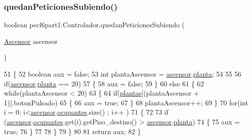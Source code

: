 \subsubsection{\texorpdfstring{quedan\+Peticiones\+Subiendo()}{quedanPeticionesSubiendo()}}
{\footnotesize\ttfamily boolean pecl6part1.\+Controlador.\+quedan\+Peticiones\+Subiendo (\begin{DoxyParamCaption}\item[{\mbox{\hyperlink{classpecl6part1_1_1_ascensor}{Ascensor}}}]{ascensor }\end{DoxyParamCaption})\hspace{0.3cm}{\ttfamily [inline]}}


\begin{DoxyCode}
51     \{
52         \textcolor{keywordtype}{boolean} aux = \textcolor{keyword}{false};
53         \textcolor{keywordtype}{int} plantaAscensor = \mbox{\hyperlink{classpecl6part1_1_1_controlador_ab1a946290b47216d355b09da476486db}{ascensor}}.\mbox{\hyperlink{classpecl6part1_1_1_ascensor_a580b836287ba07c6658c03a5e35fbbdb}{planta}};
54         
55         
56         \textcolor{keywordflow}{if}(\mbox{\hyperlink{classpecl6part1_1_1_controlador_ab1a946290b47216d355b09da476486db}{ascensor}}.\mbox{\hyperlink{classpecl6part1_1_1_ascensor_a580b836287ba07c6658c03a5e35fbbdb}{planta}} == 20)
57         \{
58             aux = \textcolor{keyword}{false};
59         \}
60         \textcolor{keywordflow}{else}
61         \{
62             \textcolor{keywordflow}{while}(plantaAscensor < 20)
63             \{
64                 \textcolor{keywordflow}{if}(\mbox{\hyperlink{classpecl6part1_1_1_controlador_af8149da8845735945b38d7a29a50e397}{plantas}}[(plantaAscensor + 1)].botonPulsado)
65                 \{
66                     aux = \textcolor{keyword}{true};
67                 \}
68                 plantaAscensor++;
69             \}
70             \textcolor{keywordflow}{for}(\textcolor{keywordtype}{int} i = 0; i<\mbox{\hyperlink{classpecl6part1_1_1_controlador_ab1a946290b47216d355b09da476486db}{ascensor}}.\mbox{\hyperlink{classpecl6part1_1_1_ascensor_aabf71a3bf26b3bff458534e518835c71}{ocupantes}}.size() ; i++ )
71             \{
72                 
73                     \textcolor{keywordflow}{if} (\mbox{\hyperlink{classpecl6part1_1_1_controlador_ab1a946290b47216d355b09da476486db}{ascensor}}.\mbox{\hyperlink{classpecl6part1_1_1_ascensor_aabf71a3bf26b3bff458534e518835c71}{ocupantes}}.get(i).getPiso\_destino() > 
      \mbox{\hyperlink{classpecl6part1_1_1_controlador_ab1a946290b47216d355b09da476486db}{ascensor}}.\mbox{\hyperlink{classpecl6part1_1_1_ascensor_a580b836287ba07c6658c03a5e35fbbdb}{planta}})
74                     \{
75                         aux = \textcolor{keyword}{true};
76                     \}
77                 
78             \}
79         \}
80         
81         \textcolor{keywordflow}{return} aux;
82     \}
\end{DoxyCode}
\mbox{\label{classpecl6part1_1_1_controlador_a6eb5b70059a6cbcccc871edaac2f2c8d}} 
